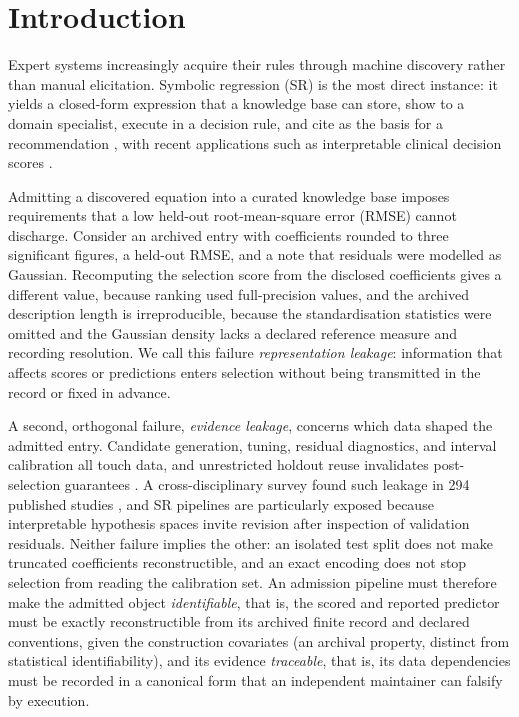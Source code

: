 \section{Introduction}\label{sec:introduction}

Expert systems increasingly acquire their rules through machine discovery rather than manual elicitation. Symbolic regression (SR) is the most direct instance: it yields a closed-form expression that a knowledge base can store, show to a domain specialist, execute in a decision rule, and cite as the basis for a recommendation \citep{schmidt2009,brunton2016,udrescu2020aifeynman,kramer2026automated}, with recent applications such as interpretable clinical decision scores \citep{aldeia2026clinical}.

Admitting a discovered equation into a curated knowledge base imposes requirements that a low held-out root-mean-square error (RMSE) cannot discharge. Consider an archived entry with coefficients rounded to three significant figures, a held-out RMSE, and a note that residuals were modelled as Gaussian. Recomputing the selection score from the disclosed coefficients gives a different value, because ranking used full-precision values, and the archived description length is irreproducible, because the standardisation statistics were omitted and the Gaussian density lacks a declared reference measure and recording resolution. We call this failure \emph{representation leakage}: information that affects scores or predictions enters selection without being transmitted in the record or fixed in advance.

A second, orthogonal failure, \emph{evidence leakage}, concerns which data shaped the admitted entry. Candidate generation, tuning, residual diagnostics, and interval calibration all touch data, and unrestricted holdout reuse invalidates post-selection guarantees \citep{berk2013postselection,dwork2015holdout}. A cross-disciplinary survey found such leakage in 294 published studies \citep{kapoor2023leakage}, and SR pipelines are particularly exposed because interpretable hypothesis spaces invite revision after inspection of validation residuals. Neither failure implies the other: an isolated test split does not make truncated coefficients reconstructible, and an exact encoding does not stop selection from reading the calibration set. An admission pipeline must therefore make the admitted object \emph{identifiable}, that is, the scored and reported predictor must be exactly reconstructible from its archived finite record and declared conventions, given the construction covariates (an archival property, distinct from statistical identifiability), and its evidence \emph{traceable}, that is, its data dependencies must be recorded in a canonical form that an independent maintainer can falsify by execution.

